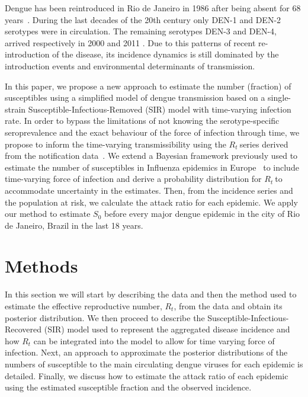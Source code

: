 \documentclass[10pt]{article}
\def \rr {$R_{t}\:$}
\begin{document}
Dengue has been reintroduced in Rio de Janeiro in 1986 after being absent for 
68 years~\citep{nogueira1999dengue}.
During the last decades of the 20th century only DEN-1 and DEN-2 serotypes were 
in circulation. The remaining serotypes DEN-3 and DEN-4, arrived respectively 
in 2000 and 2011 \citep{de2004dengue, nogueira2011dengue}. Due to this patterns 
of recent re-introduction of the disease, its incidence dynamics is still 
dominated by the introduction events and environmental determinants of 
transmission. 

In this paper, we propose a new approach to estimate the number (fraction) of 
susceptibles using a simplified model of dengue transmission based on a 
single-strain Susceptible-Infectious-Removed (SIR) model with time-varying 
infection rate.
In order to bypass the limitations of not knowing the serotype-specific 
seroprevalence and the exact behaviour of the force of infection through time, 
we propose to inform the time-varying transmissibility using the \rr series 
derived from the notification data~\citep{nishiura}.
We extend a Bayesian framework previously used to estimate the number 
of susceptibles in Influenza epidemics in Europe~\citep{pone2011} to include 
time-varying force of infection and derive a probability distribution  for 
\rr to accommodate uncertainty in the estimates. 
Then, from the incidence series and the population at risk, we  calculate the 
attack ratio for each epidemic.
We apply our method to estimate $S_0$ before every major dengue epidemic in the 
city of Rio de Janeiro, Brazil in the last 18 years.

\section*{Methods}

In this section we will start by describing the data and then the method used 
to estimate the effective reproductive number, $R_t$, from the data and obtain 
its posterior distribution. 
We then proceed to describe the Susceptible-Infectious-Recovered (SIR) model 
used to represent the aggregated disease incidence and how $R_t$ can be 
integrated into the model to allow for time varying force of infection. 
Next, an approach to approximate the posterior distributions 
of the numbers of susceptible to the main circulating dengue viruses for each 
epidemic is detailed.
Finally, we discuss how to estimate the attack ratio of each 
epidemic using the estimated susceptible fraction and the observed incidence.
\end{document}
